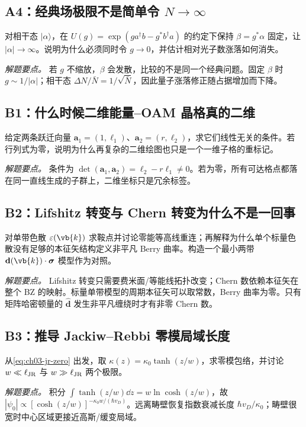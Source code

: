 \subsection*{A4：经典场极限不是简单令 $N\to\infty$}
对相干态 $|\alpha\rangle$，在 $U(g)=\exp(g a^\dagger b-g^*b^\dagger a)$ 的约定下保持 $\beta=g^*\alpha$ 固定，让 $|\alpha|\to\infty$。说明为什么必须同时令 $g\to0$，并估计相对光子数涨落如何消失。

\textit{解题要点。} 若 $g$ 不缩放，$\beta$ 会发散，比较的不是同一个经典问题。固定 $\beta$ 时 $g\sim1/|\alpha|$；相干态 $\Delta N/\bar N=1/\sqrt{\bar N}$，因此量子涨落修正随占据增加而下降。

\medskip
\subsection*{B1：什么时候二维能量--OAM 晶格真的二维}
给定两条跃迁向量 $\mathbf a_1=(1,\ell_1)$、$\mathbf a_2=(r,\ell_2)$，求它们线性无关的条件。若行列式为零，说明为什么再复杂的二维绘图也只是一个一维子格的重标记。

\textit{解题要点。} 条件为 $\det(\mathbf a_1,\mathbf a_2)=\ell_2-r\ell_1\neq0$。若为零，所有可达格点都落在同一直线生成的子群上，二维坐标只是冗余标签。

\subsection*{B2：Lifshitz 转变与 Chern 转变为什么不是一回事}
对单带色散 $\varepsilon(\vb{k})$ 求鞍点并讨论零能等高线重连；再解释为什么单个标量色散没有足够的本征矢结构定义非平凡 Berry 曲率。构造一个最小两带 $\mathbf d(\vb{k})\cdot\boldsymbol\sigma$ 模型作为对照。

\textit{解题要点。} Lifshitz 转变只需要费米面/等能线拓扑改变；Chern 数依赖本征矢在整个 BZ 的映射。标量单带模型的周期本征矢可以取常数，Berry 曲率为零。只有矩阵哈密顿量的 $\hat{\mathbf d}$ 发生非平凡缠绕时才有非零 Chern 数。

\subsection*{B3：推导 Jackiw--Rebbi 零模局域长度}
从\cref{eq:ch03-jr-zero} 出发，取 $\kappa(z)=\kappa_0\tanh(z/w)$，求零模包络，并讨论 $w\ll\ell_{\rm JR}$ 与 $w\gg\ell_{\rm JR}$ 两个极限。

\textit{解题要点。} 积分 $\int\tanh(z/w)\dd z=w\ln\cosh(z/w)$，故 $|\psi_0|\propto[\cosh(z/w)]^{-\kappa_0w/(\hbar v_D)}$。远离畴壁恢复指数衰减长度 $\hbar v_D/\kappa_0$；畴壁很宽时中心区域更接近高斯/缓变局域。

